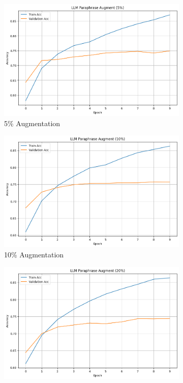 \documentclass{article}
\begin{document}
\begin{figure}[ht]
  \centering
  \begin{subfigure}[b]{0.3\textwidth}
    \includegraphics[width=\textwidth]{img/llm_5_rnn.png}
    \caption{5\% Augmentation}
    \label{fig:llm_5_rnn}
  \end{subfigure}
  \hfill
  \begin{subfigure}[b]{0.3\textwidth}
    \includegraphics[width=\textwidth]{img/llm_10_rnn.png}
    \caption{10\% Augmentation}
    \label{fig:llm_10_rnn}
  \end{subfigure}
  \hfill
  \begin{subfigure}[b]{0.3\textwidth}
    \includegraphics[width=\textwidth]{img/llm_20_rnn.png}

\end{subfigure}
\end{figure}
\end{document}

